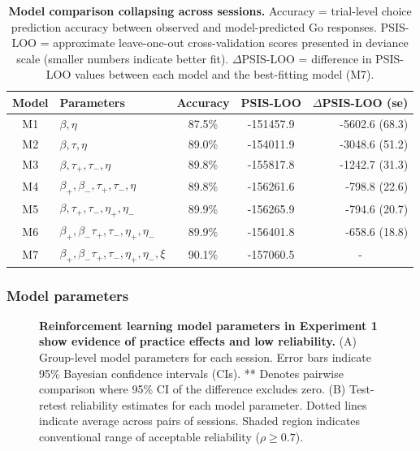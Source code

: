 \documentclass[a4paper,12pt]{article}
\begin{document}
\begin{refsection}[main]
\begin{table}[b!]
    \centering
    \begin{tabular}{clccr}
        \toprule
        Model & Parameters & Accuracy & PSIS-LOO & $\Delta$PSIS-LOO (se) \\
        \midrule
        M1 & $\beta, \eta$ & 87.5\% & -151457.9 & -5602.6 (68.3) \\
        M2 & $\beta, \tau, \eta$ & 89.0\% & -154011.9 & -3048.6 (51.2) \\
        M3 & $\beta, \tau_+, \tau_-, \eta$ & 89.8\% & -155817.8 & -1242.7 (31.3) \\
        M4 & $\beta_+, \beta_-, \tau_+, \tau_-, \eta$ & 89.8\% & -156261.6 & -798.8 (22.6) \\
        M5 & $\beta, \tau_+, \tau_-, \eta_+, \eta_-$ & 89.9\% & -156265.9 & -794.6 (20.7) \\
        M6 & $\beta_+, \beta_- \tau_+, \tau_-, \eta_+, \eta_-$ & 89.9\% & -156401.8 & -658.6 (18.8) \\
        M7 & $\beta_+, \beta_- \tau_+, \tau_-, \eta_+, \eta_-, \xi$ & 90.1\% & -157060.5 & \multicolumn{1}{c}{-} \\
        \bottomrule
\end{tabular}
    \caption{{\bf Model comparison collapsing across sessions.} Accuracy = trial-level choice prediction accuracy between observed and model-predicted Go responses. PSIS-LOO = approximate leave-one-out cross-validation scores presented in deviance scale (smaller numbers indicate better fit). \break $\Delta$PSIS-LOO = difference in PSIS-LOO values between each model and the best-fitting model (M7).}
    \label{tab:exp1_mc_abbr}
\end{table}

\subsubsection*{Model parameters}

\begin{figure}[b!]
    \centerline{}
    \caption{{\bf Reinforcement learning model parameters in Experiment 1 show evidence of practice effects and low reliability.} (A) Group-level model parameters for each session. Error bars indicate 95\% Bayesian confidence intervals (CIs). ** Denotes pairwise comparison where 95\% CI of the difference excludes zero. (B) Test-retest reliability estimates for each model parameter. Dotted lines indicate average across pairs of sessions. Shaded region indicates conventional range of acceptable reliability ($\rho \geq 0.7$).}
    \label{fig:exp01_modeling}
\end{figure}


\end{refsection}
\end{document}
